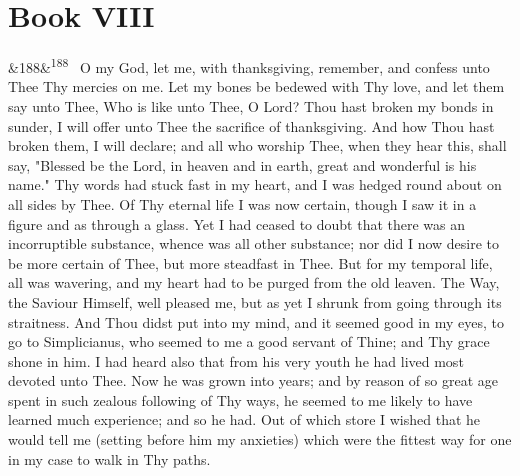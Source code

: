 \documentclass[12pt]{article}
\newcommand{\para}[1][]{\par\noindent\ifx&#1&\else\textsuperscript{\footnotesize #1}~\fi}
\begin{document}
\section*{Book VIII}

\para[188] O my God, let me, with thanksgiving, remember, and confess unto Thee Thy mercies on me. Let my bones be bedewed with Thy love, and let them say unto Thee, Who is like unto Thee, O Lord? Thou hast broken my bonds in sunder, I will offer unto Thee the sacrifice of thanksgiving. And how Thou hast broken them, I will declare; and all who worship Thee, when they hear this, shall say, "Blessed be the Lord, in heaven and in earth, great and wonderful is his name." Thy words had stuck fast in my heart, and I was hedged round about on all sides by Thee. Of Thy eternal life I was now certain, though I saw it in a figure and as through a glass. Yet I had ceased to doubt that there was an incorruptible substance, whence was all other substance; nor did I now desire to be more certain of Thee, but more steadfast in Thee. But for my temporal life, all was wavering, and my heart had to be purged from the old leaven. The Way, the Saviour Himself, well pleased me, but as yet I shrunk from going through its straitness. And Thou didst put into my mind, and it seemed good in my eyes, to go to Simplicianus, who seemed to me a good servant of Thine; and Thy grace shone in him. I had heard also that from his very youth he had lived most devoted unto Thee. Now he was grown into years; and by reason of so great age spent in such zealous following of Thy ways, he seemed to me likely to have learned much experience; and so he had. Out of which store I wished that he would tell me (setting before him my anxieties) which were the fittest way for one in my case to walk in Thy paths.
\end{document}
